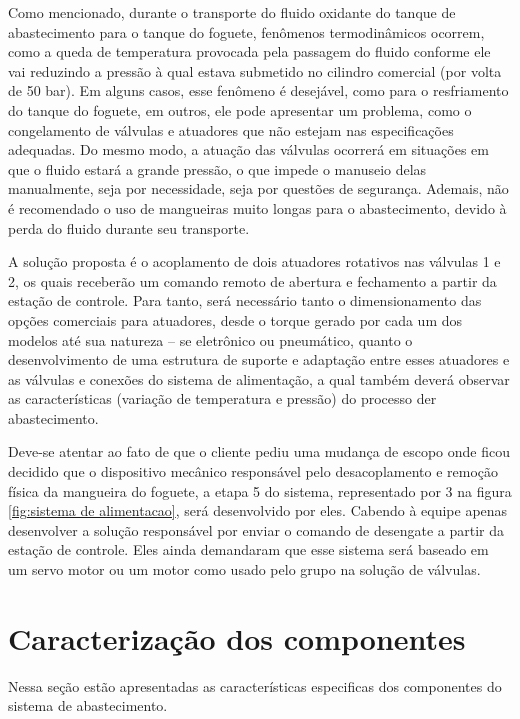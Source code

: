\par Como mencionado, durante o transporte do fluido oxidante do tanque de abastecimento para o tanque do foguete, fenômenos termodinâmicos ocorrem, como a queda de temperatura provocada pela passagem do fluido conforme ele vai reduzindo a pressão à qual estava submetido no cilindro comercial (por volta de 50 bar). Em alguns casos, esse fenômeno é desejável, como para o resfriamento do tanque do foguete, em outros, ele pode apresentar um problema, como o congelamento de válvulas e atuadores que não estejam nas especificações adequadas. Do mesmo modo, a atuação das válvulas ocorrerá em situações em que o fluido estará a grande pressão, o que impede o manuseio delas manualmente, seja por necessidade, seja por questões de segurança. Ademais, não é recomendado o uso de mangueiras muito longas para o abastecimento, devido à perda do fluido durante seu transporte.

\par A solução proposta é o acoplamento de dois atuadores rotativos nas válvulas 1 e 2, os quais receberão um comando remoto de abertura e fechamento a partir da estação de controle. Para tanto, será necessário tanto o dimensionamento das opções comerciais para atuadores, desde o torque gerado por cada um dos modelos até sua natureza – se eletrônico ou pneumático, quanto o desenvolvimento de uma estrutura de suporte e adaptação entre esses atuadores e as válvulas e conexões do sistema de alimentação, a qual também deverá observar as características (variação de temperatura e pressão) do processo der abastecimento.

\par Deve-se atentar ao fato de que o cliente pediu uma mudança de escopo onde ficou decidido que o dispositivo mecânico responsável pelo desacoplamento e remoção física da mangueira do foguete, a etapa 5 do sistema, representado por 3 na figura \ref{fig:sistema de alimentacao},  será desenvolvido por eles. Cabendo à equipe apenas desenvolver a solução responsável por enviar o comando de desengate a partir da estação de controle. Eles ainda demandaram que esse sistema será baseado em um servo motor ou um motor como usado pelo grupo na solução de válvulas.

\section{Caracterização dos componentes}

\par Nessa seção estão apresentadas as características especificas dos componentes do sistema de abastecimento.

